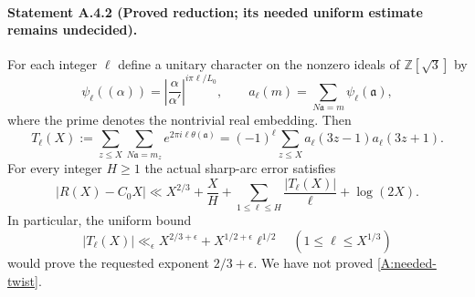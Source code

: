 
\paragraph{Statement A.4.2 (Proved reduction; its needed uniform estimate remains undecided).}
For each integer $\ell$ define a unitary character on the nonzero ideals
of $\mathbb Z[\sqrt3]$ by
\[
 \psi_\ell((\alpha))=
 \left|\frac{\alpha}{\alpha'}\right|^{i\pi\ell/L_0},
 \qquad a_\ell(m)=\sum_{N\mathfrak a=m}\psi_\ell(\mathfrak a),
\]
where the prime denotes the nontrivial real embedding. Then
\begin{equation}\label{A:twisted-shift}
 T_\ell(X):=\sum_{z\leq X}\sum_{N\mathfrak a=m_z}
 e^{2\pi i\ell\theta(\mathfrak a)}
 =(-1)^\ell\sum_{z\leq X}a_\ell(3z-1)a_\ell(3z+1).
\end{equation}
For every integer $H\geq1$ the actual sharp-arc error satisfies
\begin{equation}\label{A:ET-reduction}
 |R(X)-C_0X|\ll X^{2/3}+\frac XH+
       \sum_{1\leq\ell\leq H}\frac{|T_\ell(X)|}{\ell}
       +\log(2X).
\end{equation}
In particular, the uniform bound
\begin{equation}\label{A:needed-twist}
 |T_\ell(X)|\ll_\epsilon X^{2/3+\epsilon}
           +X^{1/2+\epsilon}\ell^{1/2}
 \quad(1\leq\ell\leq X^{1/3})
\end{equation}
would prove the requested exponent $2/3+\epsilon$.
We have not proved \eqref{A:needed-twist}.
